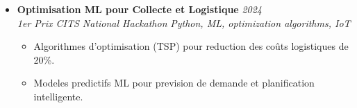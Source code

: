 \documentclass[a4paper,11pt]{article}
\begin{document}
\begin{itemize}[leftmargin=*, label={-}]
\item \textbf{Optimisation ML pour Collecte et Logistique} \hfill \textit{2024} \\
\textit{1er Prix CITS National Hackathon} \hfill \textit{Python, ML, optimization algorithms, IoT}
\vspace{-2pt}
    \begin{itemize}[leftmargin=0.4cm, nosep, label=\tiny$\bullet$]
        \item \small{Algorithmes d'optimisation (TSP) pour reduction des coûts logistiques de 20\%.}
        \item \small{Modeles predictifs ML pour prevision de demande et planification intelligente.}
    \end{itemize}

\end{itemize}
\end{document}
